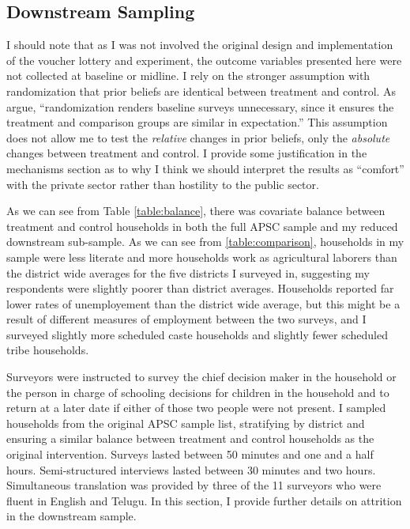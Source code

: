 \documentclass[hidelinks, 12pt, titlepage]{article}
\begin{document}
	\clearpage

	\subsection{Downstream Sampling\label{appendix:downstream}}

		I should note that as I was not involved the original design and implementation of the voucher lottery and experiment, the outcome variables presented here were not collected at baseline or midline.  I rely on the stronger assumption with randomization that prior beliefs are identical between treatment and control.  As \citeauthor{Duflo2007} \citeyearpar[45]{Duflo2007} argue, ``randomization renders baseline surveys unnecessary, since it ensures the treatment and comparison groups are similar in expectation.''  This assumption does not allow me to test the \emph{relative} changes in prior beliefs, only the \emph{absolute} changes between treatment and control.  I provide some justification in the mechanisms section as to why I think we should interpret the results as ``comfort'' with the private sector rather than hostility to the public sector.

		As we can see from Table \ref{table:balance}, there was covariate balance between treatment and control households in both the full APSC sample and my reduced downstream sub-sample.  As we can see from \ref{table:comparison}, households in my sample were less literate and more households work as agricultural laborers than the district wide averages for the five districts I surveyed in, suggesting my respondents were slightly poorer than district averages.  Households reported far lower rates of unemployement than the district wide average, but this might be a result of different measures of employment between the two surveys, and I surveyed slightly more scheduled caste households and slightly fewer scheduled tribe households.

		Surveyors were instructed to survey the chief decision maker in the household or the person in charge of schooling decisions for children in the household and to return at a later date if either of those two people were not present.  I sampled households from the original APSC sample list, stratifying by district and ensuring a similar balance between treatment and control households as the original intervention.  Surveys lasted between 50 minutes and one and a half hours.  Semi-structured interviews lasted between 30 minutes and two hours.  Simultaneous translation was provided by three of the 11 surveyors who were fluent in English and Telugu.  In this section, I provide further details on attrition in the downstream sample.
\end{document}
